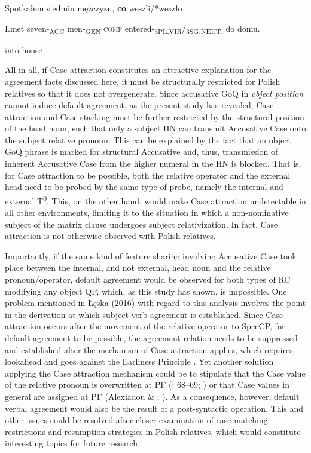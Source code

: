 \documentclass[output=paper]{langsci/langscibook}
\begin{document}
           Spotkałem   siedmiu   mężczyzn,   \textbf{co}   weszli/*weszło

  I.met     seven-\textsubscript{ACC}   men-\textsubscript{GEN}   \textsc{comp} entered-\textsubscript{3PL,VIR}/\textsubscript{3SG,NEUT.} do   domu.

  into   house

 

All in all, if Case attraction constitutes an attractive explanation for the agreement facts discussed here, it must be structurally restricted for Polish relatives so that it does not overgenerate. Since accusative GoQ in \textit{object position} cannot induce default agreement, as the present study has revealed, Case attraction and Case stacking must be further restricted by the structural position of the head noun, such that only a subject HN can transmit Accusative Case onto the subject relative pronoun. This can be explained by the fact that an object GoQ phrase is marked for structural Accusative and, thus, transmission of inherent Accusative Case from the higher numeral in the HN is blocked. That is, for Case attraction to be possible, both the relative operator and the external head need to be probed by the same type of probe, namely the internal and external T\textsuperscript{0}. This, on the other hand, would make Case attraction undetectable in all other environments, limiting it to the situation in which a non-nominative subject of the matrix clause undergoes subject relativization. In fact, Case attraction is not otherwise observed with Polish relatives. 

Importantly, if the same kind of feature sharing involving Accusative Case took place between the internal, and not external, head noun and the relative pronoun/operator, default agreement would be observed for both types of RC modifying any object QP, which, as this study has shown, is impossible. One problem mentioned in Łęska (2016) with regard to this analysis involves the point in the derivation at which subject-verb agreement is established. Since Case attraction occurs after the movement of the relative operator to SpecCP, for default agreement to be possible, the agreement relation needs to be suppressed and established after the mechanism of Case attraction applies, which requires lookahead and goes against the Earliness Principle \citep{Pesetsky1989}. Yet another solution applying the Case attraction mechanism could be to stipulate that the Case value of the relative pronoun is overwritten at PF (\citealt{Bianchi2000}: 68–69; \citealt{Spyropolous2011}) or that Case values in general are assigned at PF (Alexiadou \& \citealt{Varlokosta2007}; \citealt{Assmann2014}). As a consequence, however, default verbal agreement would also be the result of a post-syntactic operation. This and other issues could be resolved after closer examination of case matching restrictions and resumption strategies in Polish relatives, which would constitute interesting topics for future research.
\end{document}
